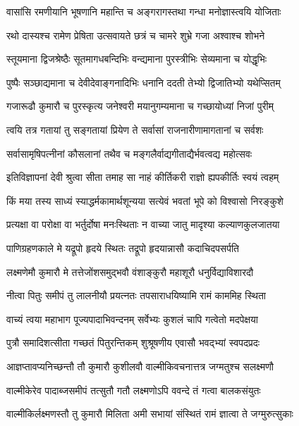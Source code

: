 \twolineshloka
{वासांसि रमणीयानि भूषणानि महान्ति च}
{अङ्गरागस्तथा गन्धा मनोज्ञास्त्वयि योजिताः}%

\twolineshloka
{रथो दास्यश्च रामेण प्रेषिता उत्सवायते}
{छत्रं च चामरे शुभ्रे गजा अश्वाश्च शोभने}%

\twolineshloka
{स्तूयमाना द्विजश्रेष्ठैः सूतमागधबन्दिभिः}
{वन्द्यमाना पुरस्त्रीभिः सेव्यमाना च योद्धृभिः}%

\twolineshloka
{पुष्पैः सञ्छाद्यमाना च देवीदेवाङ्गनादिभिः}
{धनानि ददती तेभ्यो द्विजातिभ्यो यथेप्सितम्}%

\twolineshloka
{गजारूढौ कुमारौ च पुरस्कृत्य जनेश्वरी}
{मयानुगम्यमाना च गच्छायोध्यां निजां पुरीम्}%

\twolineshloka
{त्वयि तत्र गतायां तु सङ्गतायां प्रियेण ते}
{सर्वासां राजनारीणामागतानां च सर्वशः}%

\twolineshloka
{सर्वासामृषिपत्नीनां कौसलानां तथैव च}
{मङ्गलैर्वाद्यगीताद्यैर्भवत्वद्य महोत्सवः}%


\twolineshloka
{इतिविज्ञापनां देवी श्रुत्वा सीता तमाह सा}
{नाहं कीर्तिकरी राज्ञो ह्यपकीर्तिः स्वयं त्वहम्}%

\twolineshloka
{किं मया तस्य साध्यं स्याद्धर्मकामार्थशून्यया}
{सत्येवं भवतां भूपे को विश्वासो निरङ्कुशे}%

\twolineshloka
{प्रत्यक्षा वा परोक्षा वा भर्तुर्दोषा मनःस्थिताः}
{न वाच्या जातु मादृश्या कल्याणकुलजातया}%

\twolineshloka
{पाणिग्रहणकाले मे यद्रूपो हृदये स्थितः}
{तद्रूपो हृदयान्नासौ कदाचिदपसर्पति}%

\twolineshloka
{लक्ष्मणेमौ कुमारौ मे तत्तेजोंशसमुद्भवौ}
{वंशाङ्कुरौ महाशूरौ धनुर्विद्याविशारदौ}%

\twolineshloka
{नीत्वा पितुः समीपं तु लालनीयौ प्रयत्नतः}
{तपसाराधयिष्यामि रामं काममिह स्थिता}%

\twolineshloka
{वाच्यं त्वया महाभाग पूज्यपादाभिवन्दनम्}
{सर्वेभ्यः कुशलं चापि गत्वेतो मदपेक्षया}%

\twolineshloka
{पुत्रौ समादिशत्सीता गच्छतं पितुरन्तिकम्}
{शुश्रूषणीय एवासौ भवद्भ्यां स्वपदप्रदः}%

\twolineshloka
{आज्ञप्तावप्यनिच्छन्तौ तौ कुमारौ कुशीलवौ}
{वाल्मीकिवचनात्तत्र जग्मतुश्च सलक्ष्मणौ}%

\twolineshloka
{वाल्मीकेरेव पादाब्जसमीपं तत्सुतौ गतौ}
{लक्ष्मणोऽपि ववन्दे तं गत्वा बालकसंयुतः}%

\twolineshloka
{वाल्मीकिर्लक्ष्मणस्तौ तु कुमारौ मिलिता अमी}
{सभायां संस्थितं रामं ज्ञात्वा ते जग्मुरुत्सुकाः}%

